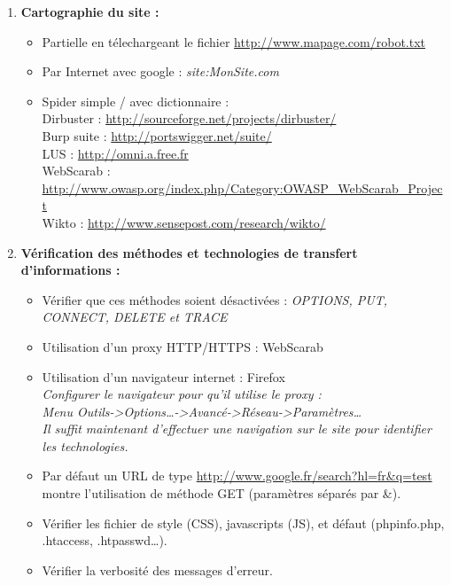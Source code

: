 \documentclass[a4paper,11pt]{article}				    %
\begin{document}
{\begin{enumerate}
	\item \textbf{Cartographie du site :}
	\begin{itemize}
		\item Partielle en t\'elechargeant le fichier \url{http://www.mapage.com/robot.txt}
		\item Par Internet avec google : {\sl \color{blue}site:MonSite.com}
		\item Spider simple / avec dictionnaire :\\
		Dirbuster : \url{http://sourceforge.net/projects/dirbuster/}\\
		Burp suite : \url{http://portswigger.net/suite/}\\
		LUS : \url{http://omni.a.free.fr}\\
		WebScarab : \url{http://www.owasp.org/index.php/Category:OWASP_WebScarab_Project}\\
		Wikto : \url{http://www.sensepost.com/research/wikto/}
	\end{itemize}

	\item \textbf{V\'erification des m\'ethodes et technologies de transfert d'informations :}
	\begin{itemize}
		\item V\'erifier que ces m\'ethodes soient d\'esactiv\'ees : {\sl \color{blue}OPTIONS, PUT, CONNECT, DELETE et TRACE} %
		\item Utilisation d'un proxy HTTP/HTTPS : WebScarab
		\item Utilisation d'un navigateur internet : Firefox\\
		\textit{Configurer le navigateur pour qu'il utilise le proxy : \\
					Menu Outils->Options\dots{}->Avanc\'e->R\'eseau->Param\`etres\dots{}\\
					Il suffit maintenant d'effectuer une navigation sur le site pour identifier les technologies.}
		\item Par d\'efaut un URL de type \url{http://www.google.fr/search?hl=fr&q=test} montre l'utilisation de m\'ethode GET (param\`etres s\'epar\'es par \&).
		\item V\'erifier les fichier de style (CSS), javascripts (JS), et d\'efaut (phpinfo.php, .htaccess, .htpasswd\dots{}).
		\item V\'erifier la verbosit\'e des messages d'erreur.\\
	\end{itemize}
\end{enumerate}
}
\end{document}
